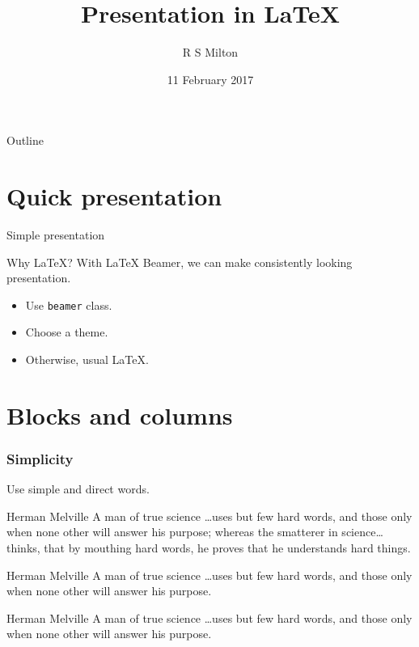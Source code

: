 \documentclass[11pt]{beamer}
\title{Presentation in LaTeX}
\author{R S Milton}
\institute{
  Department of Computer Science\\
  SSN College of Engineering
}
\date{11 February 2017}
\begin{document}
\begin{frame}
  \titlepage
\end{frame}

\begin{frame}{Outline}
  \tableofcontents
\end{frame}


\section{Quick presentation}

\begin{frame}{Simple presentation}
  \begin{block}{Why LaTeX?}
    With LaTeX Beamer, we can make consistently looking presentation.
  \end{block}
  \begin{itemize}
  \item Use \texttt{beamer} class.
  \item Choose a theme.
  \item Otherwise, usual LaTeX.
  \end{itemize}
\end{frame}

\section{Blocks and columns}

\begin{frame}
  \frametitle{Simplicity}
  Use simple and direct words.
  \begin{block}{Herman Melville}
    A man of true science \ldots uses but few hard words, and
    those only when none other will answer his purpose; whereas
    the smatterer in science\ldots thinks, that by mouthing
    hard words, he proves that he understands hard things.
  \end{block}
  \begin{alertblock}{Herman Melville}
    A man of true science \ldots uses but few hard words, and
    those only when none other will answer his purpose.
  \end{alertblock}
  \begin{exampleblock}
    {Herman Melville}
    A man of true science \ldots uses but few hard words, and
    those only when none other will answer his purpose.
  \end{exampleblock}
\end{frame}
\end{document}
